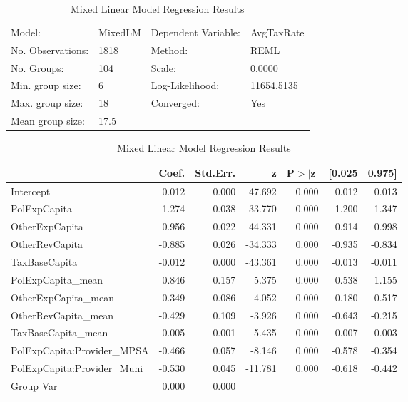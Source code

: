 \begin{table}
\caption{Mixed Linear Model Regression Results}
\label{}
\begin{center}
\begin{tabular}{llll}
\hline
Model:            & MixedLM & Dependent Variable: & AvgTaxRate  \\
No. Observations: & 1818    & Method:             & REML        \\
No. Groups:       & 104     & Scale:              & 0.0000      \\
Min. group size:  & 6       & Log-Likelihood:     & 11654.5135  \\
Max. group size:  & 18      & Converged:          & Yes         \\
Mean group size:  & 17.5    &                     &             \\
\hline
\end{tabular}
\end{center}

\begin{center}
\begin{tabular}{lrrrrrr}
\hline
                            &  Coef. & Std.Err. &       z & P$> |$z$|$ & [0.025 & 0.975]  \\
\hline
Intercept                   &  0.012 &    0.000 &  47.692 &       0.000 &  0.012 &  0.013  \\
PolExpCapita                &  1.274 &    0.038 &  33.770 &       0.000 &  1.200 &  1.347  \\
OtherExpCapita              &  0.956 &    0.022 &  44.331 &       0.000 &  0.914 &  0.998  \\
OtherRevCapita              & -0.885 &    0.026 & -34.333 &       0.000 & -0.935 & -0.834  \\
TaxBaseCapita               & -0.012 &    0.000 & -43.361 &       0.000 & -0.013 & -0.011  \\
PolExpCapita\_mean          &  0.846 &    0.157 &   5.375 &       0.000 &  0.538 &  1.155  \\
OtherExpCapita\_mean        &  0.349 &    0.086 &   4.052 &       0.000 &  0.180 &  0.517  \\
OtherRevCapita\_mean        & -0.429 &    0.109 &  -3.926 &       0.000 & -0.643 & -0.215  \\
TaxBaseCapita\_mean         & -0.005 &    0.001 &  -5.435 &       0.000 & -0.007 & -0.003  \\
PolExpCapita:Provider\_MPSA & -0.466 &    0.057 &  -8.146 &       0.000 & -0.578 & -0.354  \\
PolExpCapita:Provider\_Muni & -0.530 &    0.045 & -11.781 &       0.000 & -0.618 & -0.442  \\
Group Var                   &  0.000 &    0.000 &         &             &        &         \\
\hline
\end{tabular}
\end{center}
\end{table}
\bigskip

